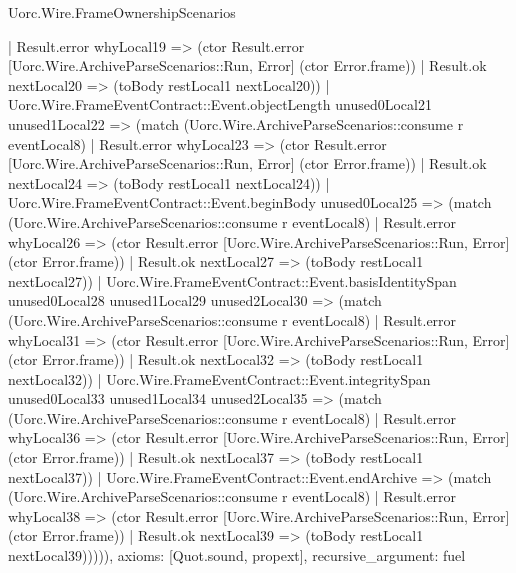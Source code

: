 \begin{lexlean}{Uorc.Wire.FrameOwnershipScenarios}
\begin{semanticmodule}
{          | Result.error whyLocal19 => (ctor Result.error [Uorc.Wire.ArchiveParseScenarios::Run, Error] (ctor Error.frame))
          | Result.ok nextLocal20 => (toBody restLocal1 nextLocal20))
        | Uorc.Wire.FrameEventContract::Event.objectLength unused0Local21 unused1Local22 => (match (Uorc.Wire.ArchiveParseScenarios::consume r eventLocal8)
          | Result.error whyLocal23 => (ctor Result.error [Uorc.Wire.ArchiveParseScenarios::Run, Error] (ctor Error.frame))
          | Result.ok nextLocal24 => (toBody restLocal1 nextLocal24))
        | Uorc.Wire.FrameEventContract::Event.beginBody unused0Local25 => (match (Uorc.Wire.ArchiveParseScenarios::consume r eventLocal8)
          | Result.error whyLocal26 => (ctor Result.error [Uorc.Wire.ArchiveParseScenarios::Run, Error] (ctor Error.frame))
          | Result.ok nextLocal27 => (toBody restLocal1 nextLocal27))
        | Uorc.Wire.FrameEventContract::Event.basisIdentitySpan unused0Local28 unused1Local29 unused2Local30 => (match (Uorc.Wire.ArchiveParseScenarios::consume r eventLocal8)
          | Result.error whyLocal31 => (ctor Result.error [Uorc.Wire.ArchiveParseScenarios::Run, Error] (ctor Error.frame))
          | Result.ok nextLocal32 => (toBody restLocal1 nextLocal32))
        | Uorc.Wire.FrameEventContract::Event.integritySpan unused0Local33 unused1Local34 unused2Local35 => (match (Uorc.Wire.ArchiveParseScenarios::consume r eventLocal8)
          | Result.error whyLocal36 => (ctor Result.error [Uorc.Wire.ArchiveParseScenarios::Run, Error] (ctor Error.frame))
          | Result.ok nextLocal37 => (toBody restLocal1 nextLocal37))
        | Uorc.Wire.FrameEventContract::Event.endArchive => (match (Uorc.Wire.ArchiveParseScenarios::consume r eventLocal8)
          | Result.error whyLocal38 => (ctor Result.error [Uorc.Wire.ArchiveParseScenarios::Run, Error] (ctor Error.frame))
          | Result.ok nextLocal39 => (toBody restLocal1 nextLocal39))))),
  axioms: [Quot.sound, propext],
  recursive_argument: fuel
}


\end{semanticmodule}
\end{lexlean}
